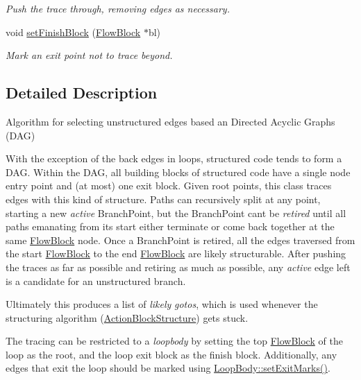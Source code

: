 \begin{DoxyCompactItemize}
\begin{DoxyCompactList}\small\item\em Push the trace through, removing edges as necessary. \end{DoxyCompactList}\item 
void \mbox{\hyperlink{class_trace_d_a_g_a013a57ad89329ea07f99781442067190}{set\+Finish\+Block}} (\mbox{\hyperlink{class_flow_block}{Flow\+Block}} $\ast$bl)
\begin{DoxyCompactList}\small\item\em Mark an exit point not to trace beyond. \end{DoxyCompactList}\end{DoxyCompactItemize}


\subsection{Detailed Description}
Algorithm for selecting unstructured edges based an Directed Acyclic Graphs (D\+AG) 

With the exception of the back edges in loops, structured code tends to form a D\+AG. Within the D\+AG, all building blocks of structured code have a single node entry point and (at most) one exit block. Given root points, this class traces edges with this kind of structure. Paths can recursively split at any point, starting a new {\itshape active} Branch\+Point, but the Branch\+Point can\textquotesingle{}t be {\itshape retired} until all paths emanating from its start either terminate or come back together at the same \mbox{\hyperlink{class_flow_block}{Flow\+Block}} node. Once a Branch\+Point is retired, all the edges traversed from the start \mbox{\hyperlink{class_flow_block}{Flow\+Block}} to the end \mbox{\hyperlink{class_flow_block}{Flow\+Block}} are likely structurable. After pushing the traces as far as possible and retiring as much as possible, any {\itshape active} edge left is a candidate for an unstructured branch.

Ultimately this produces a list of {\itshape likely} {\itshape gotos}, which is used whenever the structuring algorithm (\mbox{\hyperlink{class_action_block_structure}{Action\+Block\+Structure}}) gets stuck.

The tracing can be restricted to a {\itshape loopbody} by setting the top \mbox{\hyperlink{class_flow_block}{Flow\+Block}} of the loop as the root, and the loop exit block as the finish block. Additionally, any edges that exit the loop should be marked using \mbox{\hyperlink{class_loop_body_a24f6fd993c0e4fe0684f9fa4446e9e9c}{Loop\+Body\+::set\+Exit\+Marks()}}. 

